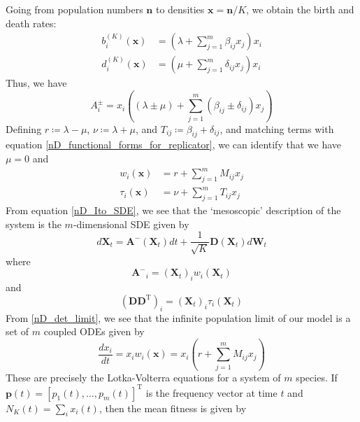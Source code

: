 Going from population numbers $\mathbf{n}$ to densities $\mathbf{x} = \mathbf{n}/K$, we obtain the birth and death rates:
\begin{equation}
\label{nD_example_density_b_d_rates}
\begin{aligned}
b^{(K)}_i(\mathbf{x}) &= \left(\lambda + \sum\limits_{j=1}^{m}\beta_{ij}x_j\right)x_i\\
d^{(K)}_i(\mathbf{x}) &= \left(\mu + \sum\limits_{j=1}^{m}\delta_{ij}x_j\right)x_i
\end{aligned}
\end{equation}
Thus, we have
\begin{equation*}
A^{\pm}_{i} = x_i\left(\left(\lambda \pm \mu\right) + \sum\limits_{j=1}^{m}\left(\beta_{ij} \pm \delta_{ij}\right)x_j\right)
\end{equation*}
Defining $r \coloneqq \lambda - \mu$, $\nu \coloneqq \lambda + \mu$, and $T_{ij} \coloneqq \beta_{ij} + \delta_{ij}$, and matching terms with equation \eqref{nD_functional_forms_for_replicator}, we can identify that we have $\mu = 0$ and
\begin{align}
	w_i(\mathbf{x}) &= r + \sum\limits_{j=1}^{m}M_{ij}x_j\label{nD_example_fitness}\\
	\tau_i(\mathbf{x}) &= \nu + \sum\limits_{j=1}^{m}T_{ij}x_j\label{nD_example_turnover}
\end{align}
From equation \eqref{nD_Ito_SDE}, we see that the `mesoscopic' description of the system is the $m$-dimensional SDE given by
\begin{equation}
\label{nD_example_SDE}
d\mathbf{X}_{t} = \mathbf{A^-}(\mathbf{X}_t)dt + \frac{1}{\sqrt{K}}\mathbf{D}(\mathbf{X}_t)d\mathbf{W}_t
\end{equation}
where 
\begin{equation*}
\mathbf{A^-}_i = {(\mathbf{X}_{t})}_iw_i(\mathbf{X}_{t})
\end{equation*}
and
\begin{equation*}
(\mathbf{D}\mathbf{D}^{\mathrm{T}})_i = {(\mathbf{X}_{t})}_i\tau_i(\mathbf{X}_{t})
\end{equation*}
From \eqref{nD_det_limit}, we see that the infinite population limit of our model is a set of $m$ coupled ODEs given by
\begin{equation}
\label{nD_example_det_limit}
\frac{d x_i}{dt} = x_iw_i(\mathbf{x}) = x_i\left(r + \sum\limits_{j=1}^{m}M_{ij}x_j\right)
\end{equation}
These are precisely the Lotka-Volterra equations for a system of $m$ species.
If $\mathbf{p}(t) = [p_1(t),\ldots,p_m(t)]^{\mathrm{T}}$ is the frequency vector at time $t$ and $N_K(t) = \sum_i x_i(t)$, then the mean fitness is given by
